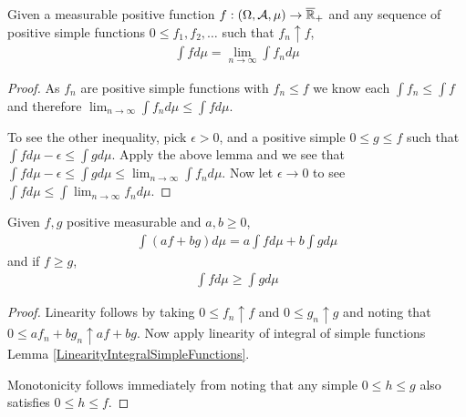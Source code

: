 \begin{cor}Given a measurable positive function $f : (\Omega, \mathcal{A},
  \mu) \to \overline{\mathbb{R}}_+$ and any sequence of positive simple functions $0 \leq f_1,
  f_2, \dots$ such that $f_n \uparrow f$, 
\begin{align*}
\int f d \mu = \lim_{n \to \infty} \int f_n d\mu
\end{align*}
\end{cor}
\begin{proof}As $f_n$ are positive simple functions with $f_n \leq f$
  we know each $\int f_n \leq \int f$ and therefore $\lim_{n \to \infty} \int f_n
  d\mu \leq \int f d \mu$.  

To see the other inequality, pick $\epsilon > 0$, and a positive
simple $0 \leq g \leq f$ such that $\int f d \mu - \epsilon \leq \int
g d \mu$.  Apply the above lemma and we see that $\int f d \mu - \epsilon \leq \int
g d \mu \leq \lim_{n \to \infty} \int f_n d \mu$.  Now let $\epsilon \to 0$ to see $\int f d \mu
\leq \int \lim_{n \to \infty} f_n d \mu$.
\end{proof}

\begin{lem}\label{LinearityAndMonotonictyPositiveIntegral}Given $f,g$ positive measurable and $a,b \geq 0$, 
\begin{align*}
\int \left ( a f + b g \right ) d \mu = a \int f d \mu + b \int g d \mu
\end{align*}
and if $f \geq g$,
\begin{align*}
\int f  d \mu \geq \int g d \mu
\end{align*}
\end{lem}
\begin{proof}Linearity follows by taking $0 \leq f_n \uparrow f$ and
  $0 \leq g_n \uparrow g$ and noting that $0 \leq a f_n + b g_n
  \uparrow a f + b g$.  Now apply linearity of integral of simple
  functions Lemma \ref{LinearityIntegralSimpleFunctions}.

Monotonicity follows immediately from noting that any simple $0 \leq h
\leq g$ also satisfies $0 \leq h \leq f$.
\end{proof}

